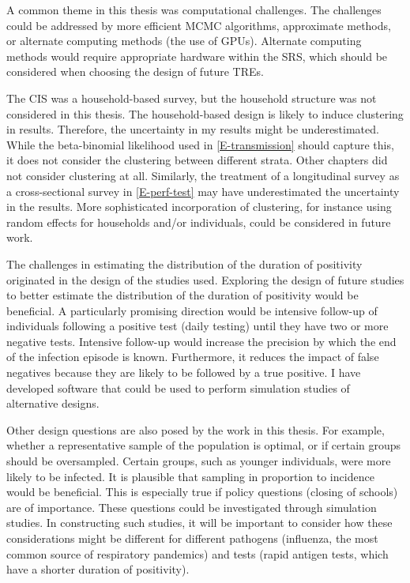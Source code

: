 \documentclass[thesis.tex]{subfiles}
\begin{document}
A common theme in this thesis was computational challenges.
The challenges could be addressed by more efficient MCMC algorithms, approximate methods, or alternate computing methods (\eg the use of GPUs).
Alternate computing methods would require appropriate hardware within the SRS, which should be considered when choosing the design of future TREs.

The CIS was a household-based survey, but the household structure was not considered in this thesis.
The household-based design is likely to induce clustering in results.
Therefore, the uncertainty in my results might be underestimated.
While the beta-binomial likelihood used in \cref{E-transmission} should capture this, it does not consider the clustering between different strata.
Other chapters did not consider clustering at all.
Similarly, the treatment of a longitudinal survey as a cross-sectional survey in \cref{E-perf-test} may have underestimated the uncertainty in the results.
More sophisticated incorporation of clustering, for instance using random effects for households and/or individuals, could be considered in future work.

The challenges in estimating the distribution of the duration of positivity originated in the design of the studies used.
Exploring the design of future studies to better estimate the distribution of the duration of positivity would be beneficial.
A particularly promising direction would be intensive follow-up of individuals following a positive test (\eg daily testing) until they have two or more negative tests.
Intensive follow-up would increase the precision by which the end of the infection episode is known.
Furthermore, it reduces the impact of false negatives because they are likely to be followed by a true positive.
I have developed software that could be used to perform simulation studies of alternative designs.

Other design questions are also posed by the work in this thesis.
For example, whether a representative sample of the population is optimal, or if certain groups should be oversampled.
Certain groups, such as younger individuals, were more likely to be infected.
It is plausible that sampling in proportion to incidence would be beneficial.
This is especially true if policy questions (\eg closing of schools) are of importance.
These questions could be investigated through simulation studies.
In constructing such studies, it will be important to consider how these considerations might be different for different pathogens (\eg influenza, the most common source of respiratory pandemics) and tests (\eg rapid antigen tests, which have a shorter duration of positivity).
\end{document}
